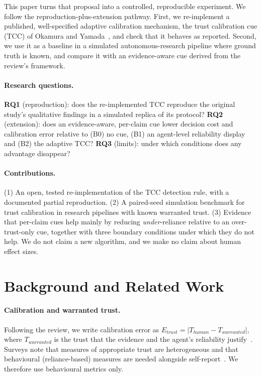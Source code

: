 \documentclass[10pt]{article}
\begin{document}
This paper turns that proposal into a controlled, reproducible experiment. We follow the reproduction-plus-extension pathway. First, we re-implement a published, well-specified adaptive calibration mechanism, the trust calibration cue (TCC) of Okamura and Yamada~\cite{okamura2020adaptive}, and check that it behaves as reported. Second, we use it as a baseline in a simulated autonomous-research pipeline where ground truth is known, and compare it with an evidence-aware cue derived from the review's framework.

\paragraph{Research questions.}
\textbf{RQ1} (reproduction): does the re-implemented TCC reproduce the original study's qualitative findings in a simulated replica of its protocol?
\textbf{RQ2} (extension): does an evidence-aware, per-claim cue lower decision cost and calibration error relative to (B0) no cue, (B1) an agent-level reliability display and (B2) the adaptive TCC?
\textbf{RQ3} (limits): under which conditions does any advantage disappear?

\paragraph{Contributions.} (1) An open, tested re-implementation of the TCC detection rule, with a documented partial reproduction. (2) A paired-seed simulation benchmark for trust calibration in research pipelines with known warranted trust. (3) Evidence that per-claim cues help mainly by reducing \emph{under}-reliance relative to an over-trust-only cue, together with three boundary conditions under which they do not help. We do not claim a new algorithm, and we make no claim about human effect sizes.

\section{Background and Related Work}
\paragraph{Calibration and warranted trust.} Following the review, we write calibration error as $E_{trust}=|T_{human}-T_{warranted}|$, where $T_{warranted}$ is the trust that the evidence and the agent's reliability justify~\cite{acharya2026review}. Surveys note that measures of appropriate trust are heterogeneous and that behavioural (reliance-based) measures are needed alongside self-report~\cite{wischnewski2023measuring,mehrotra2024systematic}. We therefore use behavioural metrics only.
\end{document}
